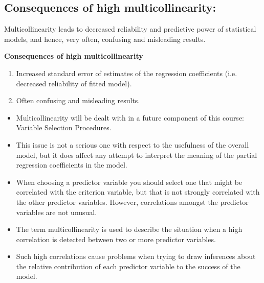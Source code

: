 \documentclass[a4paper,12pt]{article}
\begin{document}
\subsection{Consequences of high multicollinearity:}
Multicollinearity leads to decreased reliability and predictive power of statistical models, and hence, very
often, confusing and misleading results.

\textbf{Consequences of high multicollinearity}\\
\begin{enumerate}
\item Increased standard error of estimates of the regression coefficients (i.e. decreased reliability of fitted
model).
\item Often confusing and misleading results.
\end{enumerate}

\begin{itemize}
\item  Multicollinearity will be dealt with in a future component of this course: Variable Selection Procedures.
\item  This issue is not a serious one with respect to the usefulness of the overall model, but it does affect any attempt to interpret the meaning of the partial regression coefficients in the model.
\item  When choosing a predictor variable you should select one that might be correlated with the criterion
variable, but that is not strongly correlated with the other predictor variables. However, correlations
amongst the predictor variables are not unusual.
\item  The term multicollinearity is used to describe the situation when a high correlation is detected between
two or more predictor variables.
\item  Such high correlations cause problems when trying to draw inferences about the relative contribution of
each predictor variable to the success of the model.
\end{itemize}
\end{document}
